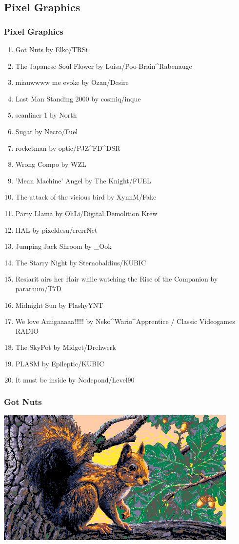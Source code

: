 \documentclass{beamer}
\begin{document}
\subsection{Pixel Graphics}
\begin{frame}
  \frametitle{Pixel Graphics}
  \begin{enumerate}
  \item Got Nuts by Elko/TRSi
  \item The Japanese Soul Flower by Luisa/Poo-Brain\^{}Rabenauge
  \item miauwwww me evoke by Ozan/Desire
  \item Last Man Standing 2000 by cosmiq/inque
  \item scanliner 1 by North
  \item Sugar by Necro/Fuel
  \item rocketman by optic/PJZ\^{}FD\^{}DSR
  \item Wrong Compo by WZL
  \item 'Mean Machine' Angel by The Knight/FUEL
  \item The attack of the vicious bird by XynnM/Fake
  \item Party Llama by OhLi/Digital Demolition Krew
  \end{enumerate}
\end{frame}
\begin{frame}
  \begin{enumerate}
    \setcounter{enumi}{11}
  \item HAL by pixeldesu/rrerrNet
  \item Jumping Jack Shroom by \_Ook
  \item The Starry Night by Sternobaldius/KUBIC
  \item Resiarit airs her Hair while watching the Rise of the Companion by pararaum/T7D
  \item Midnight Sun by FlashyYNT
  \item We love Amigaaaaa!!!!! by Neko\^{}Wario\^{}Apprentice / Classic Videogames RADIO
  \item The SkyPot by Midget/Drehwerk
  \item PLASM by Epileptic/KUBIC
  \item It must be inside by Nodepond/Level90
  \end{enumerate}
\end{frame}

\begin{frame}
  \frametitle{Got Nuts}
  \includegraphics[width=\textwidth]{got_nuts}
\end{frame}
\end{document}
